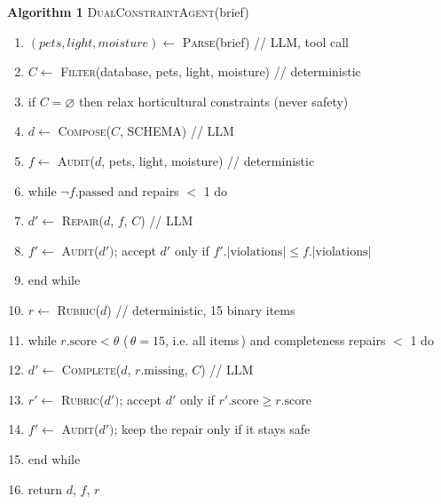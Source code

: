\documentclass[12pt,a4paper]{article}
\begin{document}
\begin{table}[t]
\centering
\begin{minipage}{0.94\linewidth}
\small
\textbf{Algorithm 1} \quad \textsc{DualConstraintAgent}(brief)
\begin{enumerate}[leftmargin=1.6em]
  \item $(pets, light, moisture) \leftarrow$ \textsc{Parse}(brief) \quad // LLM, tool call
  \item $C \leftarrow$ \textsc{Filter}(database, pets, light, moisture) \quad // deterministic
  \item if $C = \varnothing$ then relax horticultural constraints (never safety)
  \item $d \leftarrow$ \textsc{Compose}($C$, \textsc{SCHEMA}) \quad // LLM
  \item $f \leftarrow$ \textsc{Audit}($d$, pets, light, moisture) \quad // deterministic
  \item while $\neg f.\mathrm{passed}$ and repairs $<$ 1 do
  \item \quad $d' \leftarrow$ \textsc{Repair}($d$, $f$, $C$) \quad // LLM
  \item \quad $f' \leftarrow$ \textsc{Audit}($d')$; accept $d'$ only if $f'.|\mathrm{violations}| \le f.|\mathrm{violations}|$
  \item end while
  \item $r \leftarrow$ \textsc{Rubric}($d$) \quad // deterministic, 15 binary items
  \item while $r.\mathrm{score} < \theta$ (\,$\theta=15$, i.e. all items\,) and completeness repairs $<$ 1 do
  \item \quad $d' \leftarrow$ \textsc{Complete}($d$, $r.\mathrm{missing}$, $C$) \quad // LLM
  \item \quad $r' \leftarrow$ \textsc{Rubric}($d')$; accept $d'$ only if $r'.\mathrm{score} \ge r.\mathrm{score}$
  \item \quad $f' \leftarrow$ \textsc{Audit}($d')$; keep the repair only if it stays safe
  \item end while
  \item return $d$, $f$, $r$
\end{enumerate}


\end{minipage}
\end{table}
\end{document}
